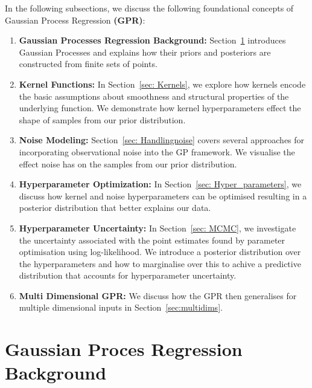 \documentclass{ucdgradtaughtthesis}
\begin{document}
In the following subsections, we discuss the following foundational concepts of Gaussian Process Regression \textbf{(GPR)}:
\begin{enumerate}
    \item \textbf{Gaussian Processes Regression Background:} Section~\ref{sec: GP_backgroound} introduces Gaussian Processes and explains how their priors and posteriors are constructed from finite sets of points.
    \item \textbf{Kernel Functions:} In Section~\ref{sec: Kernels}, we explore how kernels encode the basic assumptions about smoothness and structural properties of the underlying function.
     We demonstrate how kernel hyperparameters effect the shape of samples from our prior distribution.
    \item \textbf{Noise Modeling:} Section~\ref{sec: Handlingnoise} covers several approaches for incorporating observational noise into the GP framework. We visualise the effect noise has on the samples from our prior distribution.
    \item \textbf{Hyperparameter Optimization:} In Section~\ref{sec: Hyper_parameters}, we discuss how kernel and noise hyperparameters can be optimised resulting in a posterior distribution that better explains our data.
    \item \textbf{Hyperparameter Uncertainty:} In Section~\ref{sec: MCMC}, we investigate the uncertainty associated with the point estimates found by parameter optimisation using log-likelihood.
    We introduce a posterior distribution over the hyperparameters and how to marginalise over this to achive a predictive distribution that accounts for hyperparameter uncertainty.
    \item \textbf{Multi Dimensional GPR:} We discuss how the GPR then generalises for multiple dimensional inputs in Section~\ref{sec:multidims}.
\end{enumerate}

\section{Gaussian Proces Regression Background}
\label{sec: GP_backgroound}
\end{document}
